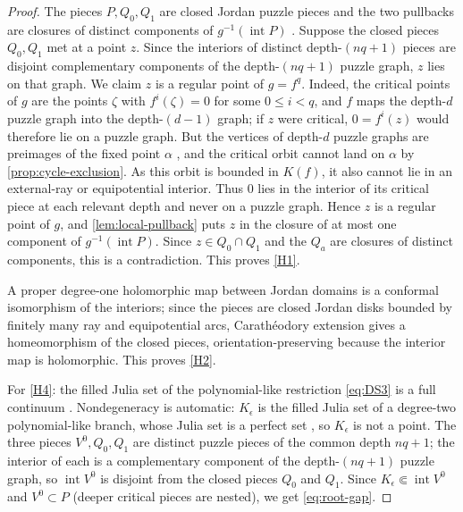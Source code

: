 \documentclass[11pt,reqno]{amsart}
\numberwithin{equation}{section}
\theoremstyle{plain}
\theoremstyle{definition}
\theoremstyle{remark}
\newcommand{\rootK}{K_{\epsilon}}
\begin{document}
\begin{proof}
The pieces $P,Q_0,Q_1$ are closed Jordan puzzle pieces and the two
pullbacks are closures of distinct components of
$g^{-1}(\operatorname{int}P)$ \cite{KLDecorations08}.  Suppose the
closed pieces $Q_0,Q_1$ met at a point $z$.  Since the interiors of
distinct depth-$(nq+1)$ pieces are disjoint complementary components of
the depth-$(nq+1)$ puzzle graph, $z$ lies on that graph.  We claim $z$
is a regular point of $g=f^q$.  Indeed, the critical points of $g$ are
the points $\zeta$ with $f^i(\zeta)=0$ for some $0\le i<q$, and $f$
maps the depth-$d$ puzzle graph into the depth-$(d-1)$ graph; if $z$
were critical, $0=f^i(z)$ would therefore lie on a puzzle graph.  But
the vertices of depth-$d$ puzzle graphs are preimages of the fixed
point $\alpha$ \cite{KLDecorations08}, and the critical orbit cannot
land on $\alpha$ by \cref{prop:cycle-exclusion}.  As this orbit is
bounded in $K(f)$, it also cannot lie in an external-ray or
equipotential interior.  Thus $0$ lies in the interior of its
critical piece at each relevant depth and never on a puzzle graph.  Hence $z$ is a regular point of $g$, and
\cref{lem:local-pullback} puts $z$ in the closure of at most one
component of $g^{-1}(\operatorname{int}P)$.  Since
$z\in Q_0\cap Q_1$ and the $Q_a$ are closures of distinct components,
this is a contradiction.  This proves \ref{H1}.

A proper degree-one holomorphic map between Jordan domains is a
conformal isomorphism of the interiors; since the pieces are closed
Jordan disks bounded by finitely many ray and equipotential arcs,
Carath\'eodory extension gives a homeomorphism of the closed pieces,
orientation-preserving because the interior map is holomorphic.  This
proves \ref{H2}.

For \ref{H4}: the filled Julia set of the polynomial-like restriction
\eqref{eq:DS3} is a full continuum \cite{DH85}.  Nondegeneracy is
automatic: $\rootK$ is the filled Julia set of a degree-two
polynomial-like branch, whose Julia set is a perfect set \cite{DH85},
so $\rootK$ is not a point.  The three pieces $V^0,Q_0,Q_1$ are
distinct puzzle pieces of the common depth $nq+1$; the interior of each
is a complementary component of the depth-$(nq+1)$ puzzle graph, so
$\operatorname{int}V^0$ is disjoint from the closed pieces $Q_0$ and
$Q_1$.  Since $\rootK\Subset\operatorname{int}V^0$ and $V^0\subset P$
(deeper critical pieces are nested), we get \eqref{eq:root-gap}.
\end{proof}
\end{document}
